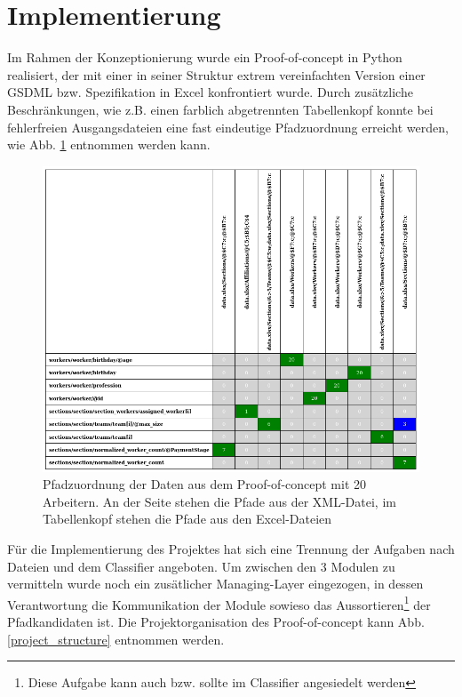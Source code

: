 \documentclass[a4paper,10pt]{article}
\begin{document}
\section{Implementierung}
Im Rahmen der Konzeptionierung wurde ein Proof-of-concept in Python realisiert, der mit einer in seiner Struktur
extrem vereinfachten Version einer GSDML bzw. Spezifikation in Excel konfrontiert wurde. Durch zusätzliche
Beschränkungen, wie z.B. einen farblich abgetrennten Tabellenkopf konnte bei fehlerfreien Ausgangsdateien eine
fast eindeutige Pfadzuordnung erreicht werden, wie Abb. \ref{classifier_ex} entnommen werden kann.
\begin{figure}[h]
 \centering
 \includegraphics[scale=0.25]{img/example_table}
 \caption{Pfadzuordnung der Daten aus dem Proof-of-concept mit 20 Arbeitern. An der Seite stehen die Pfade aus
          der XML-Datei, im Tabellenkopf stehen die Pfade aus den Excel-Dateien}
 \label{classifier_ex}
\end{figure}
Für die Implementierung des Projektes hat sich eine Trennung der Aufgaben nach Dateien und dem Classifier angeboten.
Um zwischen den 3 Modulen zu vermitteln wurde noch ein zusätlicher Managing-Layer eingezogen, in dessen Verantwortung
die Kommunikation der Module sowieso das Aussortieren\footnote{Diese Aufgabe kann auch bzw. sollte im Classifier
angesiedelt werden} der Pfadkandidaten ist. Die Projektorganisation des Proof-of-concept kann Abb.
\ref{project_structure} entnommen werden.
\end{document}
